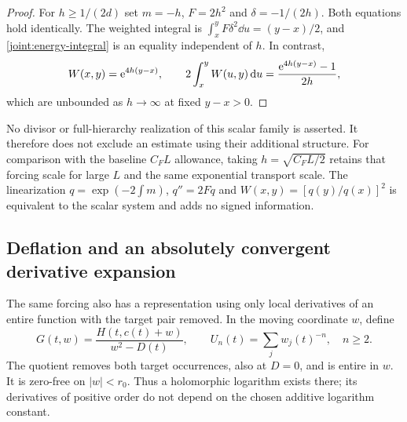 \begin{proof}
For $h\ge1/(2d)$ set $m=-h$, $F=2h^2$ and $\delta=-1/(2h)$.
Both equations hold identically. The weighted integral is
$\int_x^yF\delta^2\dd u=(y-x)/2$, and
\eqref{joint:energy-integral} is an equality independent of $h$.
In contrast,
\begin{equation}
 W(x,y)=\mathrm e^{4h(y-x)},\qquad
 2\int_x^yW(u,y)\,\mathrm d u=\frac{\mathrm e^{4h(y-x)}-1}{2h},
 \label{joint:scalar-cost}
\end{equation}
which are unbounded as $h\to\infty$ at fixed $y-x>0$.
\end{proof}

No divisor or full-hierarchy realization of this scalar family is asserted.
It therefore does not exclude an estimate using their additional structure.
For comparison with the baseline $C_FL$ allowance, taking
$h=\sqrt{C_FL/2}$ retains that forcing scale for large $L$ and the same
exponential transport scale. The linearization
$q=\exp(-2\int m)$, $q''=2Fq$ and $W(x,y)=[q(y)/q(x)]^2$ is equivalent
to the scalar system and adds no signed information.

\subsection{Deflation and an absolutely convergent derivative expansion}

The same forcing also has a representation using only local derivatives
of an entire function with the target pair removed. In the moving
coordinate $w$, define
\begin{equation}
 G(t,w)=\frac{H(t,c(t)+w)}{w^2-D(t)},\qquad
 U_n(t)=\sum_j w_j(t)^{-n},\quad n\ge2.
 \label{joint:deflated-field}
\end{equation}
The quotient removes both target occurrences, also at $D=0$, and is
entire in $w$. It is zero-free on $|w|<r_0$. Thus a holomorphic logarithm
exists there; its derivatives of positive order do not depend on the
chosen additive logarithm constant.


